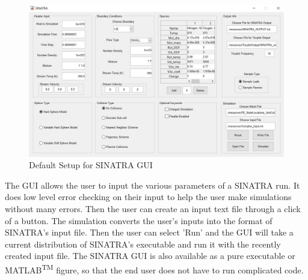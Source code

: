 \begin{figure}
\includegraphics[width=.95\textwidth]{figures/SINATRA_GUI.JPG}
\centering
\caption{Default Setup for SINATRA GUI}
\label{fig:SinatraGUI}
\end{figure}


\indent The GUI allows the user to input the various parameters of a SINATRA run. It does low level error checking on their input to help the user make simulations without many errors. Then the user can create an input text file through a click of a button. The simulation converts the user’s inputs into the format of SINATRA’s input file. Then the user can select ’Run’ and the GUI will take a current distribution of SINATRA’s executable and run it with the recently created input file. The SINATRA GUI is also available as a pure executable or MATLAB\textsuperscript{TM} figure, so that the end user does not have to run complicated code. 



